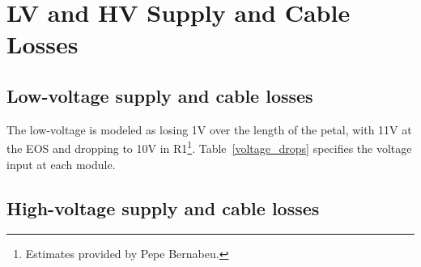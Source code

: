 
\section{LV and HV Supply and Cable Losses}

\subsection{Low-voltage supply and cable losses}

The low-voltage is modeled as losing 1V over the length of the petal, with 11V at the EOS and
dropping to 10V in R1\footnote{Estimates provided by Pepe Bernabeu.}.
Table~\ref{voltage_drops} specifies the voltage input at each module.

\begin{table}[ht]
\begin{center}
\end{center}
\caption{Voltage inputs for each endcap module. The EOS is assumed to have an 11V input voltage.}
\label{voltage_drops}
\end{table}

\subsection{High-voltage supply and cable losses}


